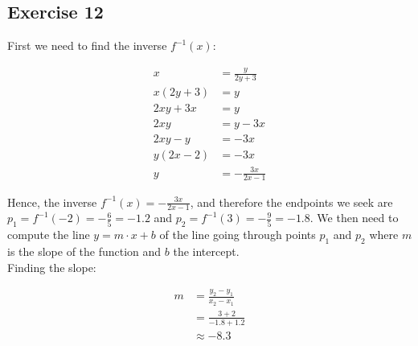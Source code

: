 \documentclass[a4paper]{article}
\newcommand{\exercise}[2]{\subsection*{Exercise #1}{#2}}
\begin{document}
\exercise{12}{%

First we need to find the inverse $f^{-1}(x)$:

\begin{align*}
x &= \frac{y}{2y + 3}\\
x(2y + 3) &= y \\
2xy + 3x &= y\\
2xy &= y - 3x\\
2xy - y &= -3x\\
y(2x - 2) &= -3x\\
y &= - \frac{3x}{2x-1}
\end{align*}

Hence, the inverse $f^{-1}(x) = - \frac{3x}{2x - 1}$, and therefore the endpoints we seek are $p_1 = f^{-1}(-2) = - \frac{6}{5} = -1.2$ and $p_2=f^{-1}(3) = - \frac{9}{5} = -1.8$. We then need to compute the line $y=m\cdot x + b$ of the line going through points $p_1$ and $p_2$ 
where $m$ is the slope of the function and $b$ the intercept.\\

Finding the slope:

\begin{align*}
m &= \frac{y_2 - y_1}{x_2 - x_1}\\
&= \frac{3 + 2}{-1.8 + 1.2}\\
&\approx -8.3
\end{align*}

}
\end{document}
